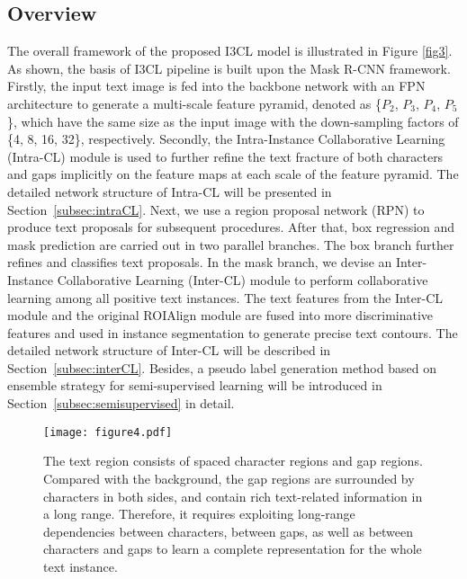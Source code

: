 \subsection{Overview}
The overall framework of the proposed I3CL model is illustrated in Figure \ref{fig3}. As shown, the basis of I3CL pipeline is built upon the Mask R-CNN framework. Firstly, the input text image is fed into the backbone network with an FPN \citep{fpn} architecture to generate a multi-scale feature pyramid, denoted as \{$P_{2}$, $P_{3}$, $P_{4}$, $P_{5}$\}, which have the same size as the input image with the down-sampling factors of \{4, 8, 16, 32\}, respectively. Secondly, the Intra-Instance Collaborative Learning (Intra-CL) module is used to further refine the text fracture of both characters and gaps implicitly on the feature maps at each scale of the feature pyramid. The detailed network structure of Intra-CL will be presented in Section~\ref{subsec:intraCL}. Next, we use a region proposal network (RPN) to produce text proposals for subsequent procedures. After that, box regression and mask prediction are carried out in two parallel branches. The box branch further refines and classifies text proposals. In the mask branch, we devise an Inter-Instance Collaborative Learning (Inter-CL) module to perform collaborative learning among all positive text instances. The text features from the Inter-CL module and the original ROIAlign module are fused into more discriminative features and used in instance segmentation to generate precise text contours. The detailed network structure of Inter-CL will be described in Section~\ref{subsec:interCL}. Besides, a pseudo label generation method based on ensemble strategy for semi-supervised learning will be introduced in Section~\ref{subsec:semisupervised} in detail. 

\begin{figure}[t]
  \centering
  \texttt{[image: figure4.pdf]}
  \caption{The text region consists of spaced character regions and gap regions. Compared with the background, the gap regions are surrounded by characters in both sides, and contain rich text-related information in a long range. Therefore, it requires exploiting long-range dependencies between characters, between gaps, as well as between characters and gaps to learn a complete representation for the whole text instance. }
  \label{fig4}
\end{figure}



